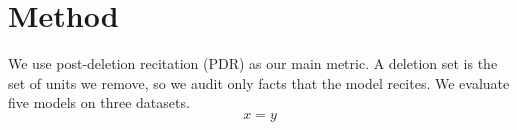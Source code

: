 \section{Method}
We use post-deletion recitation (PDR) as our main metric. A deletion set is the set of units we remove, so we audit only facts that the model recites.
We evaluate five models on three datasets.
\begin{equation}
x = y \label{eq:main}
\end{equation}
